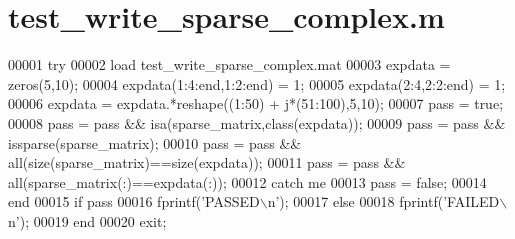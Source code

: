 \hypertarget{test__write__sparse__complex_8m_source}{}\section{test\+\_\+write\+\_\+sparse\+\_\+complex.\+m}
\label{test__write__sparse__complex_8m_source}

\begin{DoxyCode}
00001 \textcolor{keywordflow}{try}
00002     load test\_write\_sparse\_complex.mat
00003     expdata = zeros(5,10);
00004     expdata(1:4:end,1:2:end) = 1;
00005     expdata(2:4,2:2:end) = 1;
00006     expdata = expdata.*reshape((1:50) + j*(51:100),5,10);
00007     pass = \textcolor{keyword}{true};
00008     pass = pass && isa(sparse\_matrix,\textcolor{keyword}{class}(expdata));
00009     pass = pass && issparse(sparse\_matrix);
00010     pass = pass && all(size(sparse\_matrix)==size(expdata));
00011     pass = pass && all(sparse\_matrix(:)==expdata(:));
00012 \textcolor{keywordflow}{catch} me
00013     pass = \textcolor{keyword}{false};
00014 end
00015 \textcolor{keywordflow}{if} pass
00016     fprintf(\textcolor{stringliteral}{'PASSED\(\backslash\)n'});
00017 \textcolor{keywordflow}{else}
00018     fprintf(\textcolor{stringliteral}{'FAILED\(\backslash\)n'});
00019 end
00020 exit;
\end{DoxyCode}
